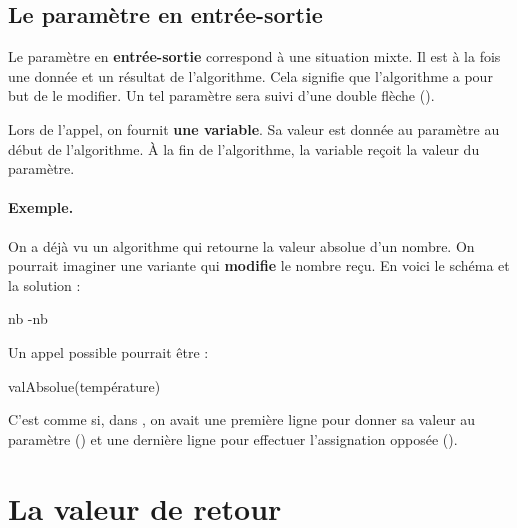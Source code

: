 	\subsection{Le paramètre en entrée-sortie}

		Le paramètre en \textbf{entrée-sortie}
		correspond à une situation mixte.
		Il est à la fois une donnée et un résultat de l'algorithme.
		Cela signifie que l'algorithme a pour but de le modifier.
		Un tel paramètre sera suivi d'une double flèche (\In\Out).
		
		Lors de l'appel, on fournit \textbf{une variable}.
		Sa valeur est donnée au paramètre au début de l'algorithme.
		À la fin de l'algorithme, la variable reçoit la valeur du paramètre.
		
		\paragraph{Exemple.}
		On a déjà vu un algorithme qui retourne la valeur absolue d'un nombre.
		On pourrait imaginer une variante qui \textbf{modifie}
		le nombre reçu.
		En voici le schéma et la solution :

		\begin{minipage}{6cm}		
			\begin{center}
			\end{center}
		\end{minipage}
		\quad
		\begin{minipage}{6cm}		
			\begin{LDA}
						\Let nb \Gets -nb
					\EndIf
				\EndAlgo
			\end{LDA}
		\end{minipage}
		
		Un appel possible pourrait être :

		\begin{LDA}
			\Stmt valAbsolue(température)
		\end{LDA}
	
		C'est comme si, dans ,
		on avait une première ligne pour donner sa valeur au paramètre
		()
		et une dernière ligne pour effectuer l'assignation opposée
		().
		
\section{La valeur de retour}
	
